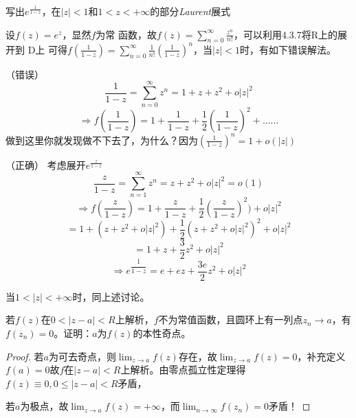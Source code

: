 \begin{eg}
	\color{blue}写出$e^{\frac{1}{1-z}}$，在$|z|<1$和$1<z<+ \infty$的部分\emph{Laurent}展式
	
	\color{black}设$f(z)=e^{z}$，显然$f$为常    函数，故$f(z)=\sum_{n=0}^{\infty}\frac{z^{n}}{n!}$，可以利用4.3.7将R上的展开到 D上
	可得$f(\frac{1}{1-z})=\sum\limits_{n=0}^{\infty}\frac{1}{n!}(\frac{1}{1-z})^{n}$，当$|z|<1$时，有如下错误解法。
	\begin{jie}{（错误）}
		\begin{equation*}
		\frac{1}{1-z}=\sum_{n=0}^{\infty}z^{n}=1+z+z^{2}+o|z|^{2} 
		\end{equation*}
		\begin{equation*}
		\Rightarrow f(\frac{1}{1-z})=1+\frac{1}{1-z}+\frac{1}{2}(\frac{1}{1-z})^{2}+...\dots
		\end{equation*}
		做到这里你就发现做不下去了，为什么？因为$(\frac{1}{1-z})^{n}=1+o(|z|)$
	\end{jie}
	\begin{jie}{（正确）}
		考虑展开$e^{\frac{z}{1-z}}$
		\begin{equation*}
		\dfrac{z}{1-z}=\sum\limits_{n=1}^{\infty}z^{n}=z+z^{2}+o|z|^{2} =o(1)
		\end{equation*}
		\begin{equation*}
		\Rightarrow f(\dfrac{z}{1-z})=1+\dfrac{z}{1-z}+\dfrac{1}{2}(\dfrac{z}{1-z})^{2})+o|z|^{2}
		\end{equation*}
		\begin{equation*}
		=1+(z+z^{2}+o|z|^{2})+\frac{1}{2}(z+z^{2}+o|z|^{2})^{2}+o|z|^{2}
		\end{equation*}
		\begin{equation*}
		=1+z+\dfrac{3}{2}z^{2}+o|z|^{2}
		\end{equation*}
		\begin{equation*}
		\Rightarrow e^{\dfrac{1}{1-z}}=e+ez+\dfrac{3e}{2}z^{2}+o|z|^{2}
		\end{equation*}
	\end{jie}
	当$1<|z|<+\infty$时，同上述讨论。
\end{eg}
\begin{eg}
	\color{blue}若$f(z)$在$0<|z-a|<R$上解析，$f$不为常值函数，且圆环上有一列点$z_{n}\rightarrow a$，有$f(z_{n})=0$。证明：$a$为$f(z)$的本性奇点。
	
	\color{black}
	\begin{proof}
	若$a$为可去奇点，则$\displaystyle\lim_{z\rightarrow a}f(z)$存在，故$\displaystyle\lim_{z\rightarrow a}f(z)=0$，补充定义$f(a)=0$故$f$在$|z-a|<R$上解析。由零点孤立性定理得$f(z)\equiv 0 , 0\le |z-a|<R$矛盾，
	
	若$a$为极点，故$\displaystyle\lim_{z\rightarrow a}f(z)=+\infty$，而$\displaystyle\lim_{n\rightarrow \infty}f(z_{n})=0$矛盾！
	\end{proof}	
\end{eg}
